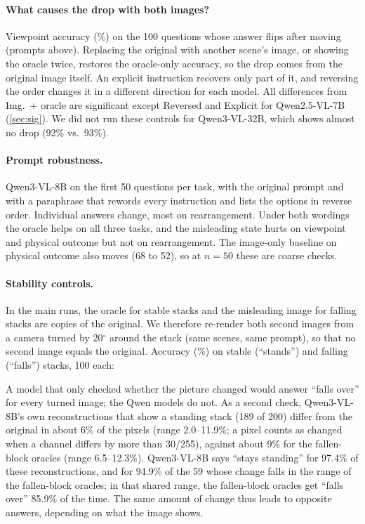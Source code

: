 \paragraph{What causes the drop with both images?} Viewpoint accuracy (\%) on the 100 questions whose answer flips after moving (prompts above). Replacing the original with another scene's image, or showing the oracle twice, restores the oracle-only accuracy, so the drop comes from the original image itself. An explicit instruction recovers only part of it, and reversing the order changes it in a different direction for each model. All differences from Img.\ + oracle are significant except Reversed and Explicit for Qwen2.5-VL-7B (\cref{sec:sig}). We did not run these controls for Qwen3-VL-32B, which shows almost no drop (92\% vs.\ 93\%).
\begin{center}\small\end{center}

\paragraph{Prompt robustness.} Qwen3-VL-8B on the first 50 questions per task, with the original prompt and with a paraphrase that rewords every instruction and lists the options in reverse order. Individual answers change, most on rearrangement. Under both wordings the oracle helps on all three tasks, and the misleading state hurts on viewpoint and physical outcome but not on rearrangement. The image-only baseline on physical outcome also moves (68 to 52), so at $n=50$ these are coarse checks.
\begin{center}\small\end{center}

\paragraph{Stability controls.} In the main runs, the oracle for stable stacks and the misleading image for falling stacks are copies of the original. We therefore re-render both second images from a camera turned by 20$^\circ$ around the stack (same scenes, same prompt), so that no second image equals the original. Accuracy (\%) on stable (``stands'') and falling (``falls'') stacks, 100 each:
\begin{center}\small\end{center}
A model that only checked whether the picture changed would answer ``falls over'' for every turned image; the Qwen models do not. As a second check, Qwen3-VL-8B's own reconstructions that show a standing stack (189 of 200) differ from the original in about 6\% of the pixels (range 2.0--11.9\%; a pixel counts as changed when a channel differs by more than 30/255), against about 9\% for the fallen-block oracles (range 6.5--12.3\%). Qwen3-VL-8B says ``stays standing'' for 97.4\% of these reconstructions, and for 94.9\% of the 59 whose change falls in the range of the fallen-block oracles; in that shared range, the fallen-block oracles get ``falls over'' 85.9\% of the time. The same amount of change thus leads to opposite answers, depending on what the image shows.

